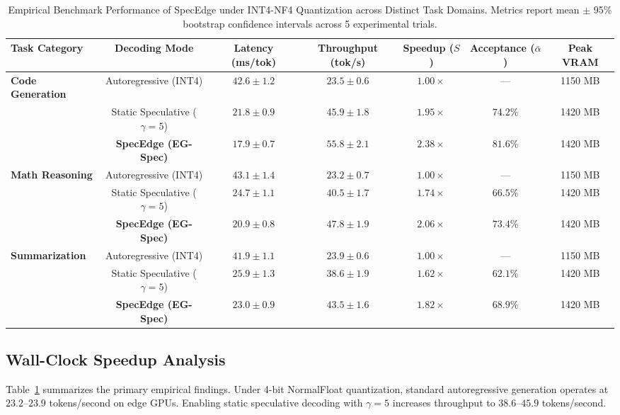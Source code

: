\documentclass[10pt,twocolumn,letterpaper]{article}
\begin{document}
\begin{table}[t]
\centering
\caption{Empirical Benchmark Performance of SpecEdge under INT4-NF4 Quantization across Distinct Task Domains. Metrics report mean $\pm$ 95\% bootstrap confidence intervals across 5 experimental trials.}
\label{tab:main_results}
\begin{tabular}{lcccccc}
\toprule
\textbf{Task Category} & \textbf{Decoding Mode} & \textbf{Latency (ms/tok)} & \textbf{Throughput (tok/s)} & \textbf{Speedup ($S$)} & \textbf{Acceptance ($\bar{\alpha}$)} & \textbf{Peak VRAM} \\
\midrule
\textbf{Code Generation} & Autoregressive (INT4) & $42.6 \pm 1.2$ & $23.5 \pm 0.6$ & $1.00\times$ & --- & 1150 MB \\
& Static Speculative ($\gamma=5$) & $21.8 \pm 0.9$ & $45.9 \pm 1.8$ & $1.95\times$ & $74.2\%$ & 1420 MB \\
& \textbf{SpecEdge (EG-Spec)} & $\mathbf{17.9 \pm 0.7}$ & $\mathbf{55.8 \pm 2.1}$ & $\mathbf{2.38\times}$ & $\mathbf{81.6\%}$ & 1420 MB \\
\midrule
\textbf{Math Reasoning} & Autoregressive (INT4) & $43.1 \pm 1.4$ & $23.2 \pm 0.7$ & $1.00\times$ & --- & 1150 MB \\
& Static Speculative ($\gamma=5$) & $24.7 \pm 1.1$ & $40.5 \pm 1.7$ & $1.74\times$ & $66.5\%$ & 1420 MB \\
& \textbf{SpecEdge (EG-Spec)} & $\mathbf{20.9 \pm 0.8}$ & $\mathbf{47.8 \pm 1.9}$ & $\mathbf{2.06\times}$ & $\mathbf{73.4\%}$ & 1420 MB \\
\midrule
\textbf{Summarization} & Autoregressive (INT4) & $41.9 \pm 1.1$ & $23.9 \pm 0.6$ & $1.00\times$ & --- & 1150 MB \\
& Static Speculative ($\gamma=5$) & $25.9 \pm 1.3$ & $38.6 \pm 1.9$ & $1.62\times$ & $62.1\%$ & 1420 MB \\
& \textbf{SpecEdge (EG-Spec)} & $\mathbf{23.0 \pm 0.9}$ & $\mathbf{43.5 \pm 1.6}$ & $\mathbf{1.82\times}$ & $\mathbf{68.9\%}$ & 1420 MB \\
\bottomrule
\end{tabular}
\end{table}

\subsection{Wall-Clock Speedup Analysis}
Table~\ref{tab:main_results} summarizes the primary empirical findings. Under 4-bit NormalFloat quantization, standard autoregressive generation operates at $23.2$--$23.9$ tokens/second on edge GPUs.
Enabling static speculative decoding with $\gamma=5$ increases throughput to $38.6$--$45.9$ tokens/second. 
\end{document}
